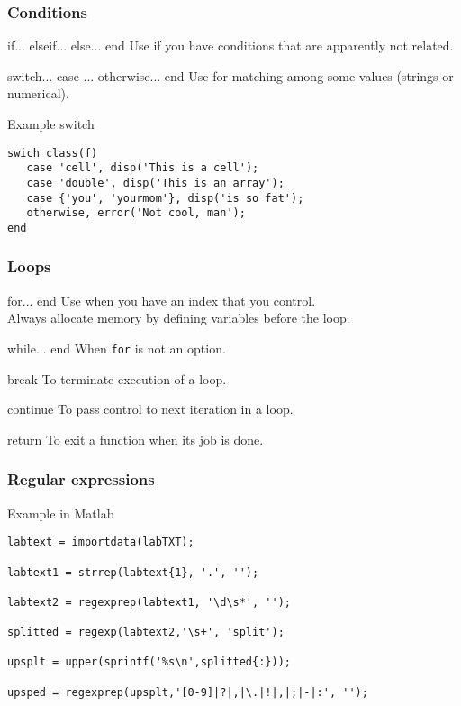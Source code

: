 \documentclass[]{beamer} %
\begin{document}
\begin{frame}[fragile]\frametitle{Conditions}\centering
\begin{block}{if... elseif... else... end}
Use if you have conditions that are apparently not related.
\end{block}
\begin{block}{switch... case ... otherwise... end}
Use for matching among some values (strings or numerical).
\end{block}
\begin{exampleblock}{Example switch}\vspace{-5mm}
\begin{verbatim}swich class(f)
   case 'cell', disp('This is a cell');
   case 'double', disp('This is an array');
   case {'you', 'yourmom'}, disp('is so fat');
   otherwise, error('Not cool, man');
end
\end{verbatim}
\end{exampleblock}
\end{frame}


\begin{frame}[fragile]\frametitle{Loops}\centering
\begin{block}{for... end}
Use when you have an index that you control. \\
Always allocate memory by defining variables before the loop.
\end{block}
\begin{block}{while... end}
When \verb+for+ is not an option.
\end{block}
\begin{block}{break}
To terminate execution of a loop.
\end{block}
\begin{block}{continue}
To pass control to next iteration in a loop.
\end{block}
\begin{block}{return}
To exit a function when its job is done.
\end{block}
\end{frame}


\begin{frame}[fragile]
\frametitle{Regular expressions}\centering
\begin{exampleblock}{Example in Matlab}
\begin{verbatim}
labtext = importdata(labTXT);

labtext1 = strrep(labtext{1}, '.', ''); 

labtext2 = regexprep(labtext1, '\d\s*', ''); 

splitted = regexp(labtext2,'\s+', 'split');

upsplt = upper(sprintf('%s\n',splitted{:}));

upsped = regexprep(upsplt,'[0-9]|?|,|\.|!|,|;|-|:', '');
\end{verbatim}
\end{exampleblock}
\end{frame}
\end{document}
